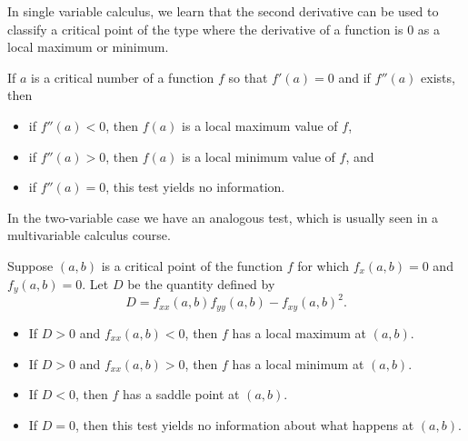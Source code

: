  \label{chap:orthogonal_diagonalization}

\vspace*{-17 pt}

\vspace*{13 pt}

\label{sec:appl_mulit_2nd_deriv}

In single variable calculus, we learn that the second derivative can be used to classify a critical point of the type where the derivative of a function is 0 as a local maximum or minimum. 

\begin{theorem}  If $a$ is a critical number of a function $f$ so that $f'(a)=0$ and if $f''(a)$ exists, then 
\begin{itemize}
\item if $f''(a) < 0$, then $f(a)$ is a local maximum value of $f$,
\item if $f''(a) > 0$, then $f(a)$ is a local minimum value of $f$, and
\item if $f''(a) = 0$,  this test yields no information.
\end{itemize}
\end{theorem}

In the two-variable case we have an analogous test, which is usually seen in a multivariable calculus course. 

\begin{theorem} Suppose $(a,b)$ is a critical point of the function $f$ for which $f_x(a,b) = 0$ and
$f_y(a,b) = 0$.  Let $D$ be the quantity defined by
\[D = f_{xx}(a,b) f_{yy}(a,b) - f_{xy}(a,b)^2.\]
\begin{itemize}
\item If $D>0$ and $f_{xx}(a,b) < 0$, then $f$ has a local maximum at $(a,b)$.
\item If $D>0$ and $f_{xx}(a,b) > 0$, then $f$ has a local minimum at $(a,b)$.
\item If $D < 0$, then $f$ has a saddle point at $(a,b)$.
\item If $D = 0$, then this test yields no information about what happens at $(a,b)$.
\end{itemize}
\end{theorem}

